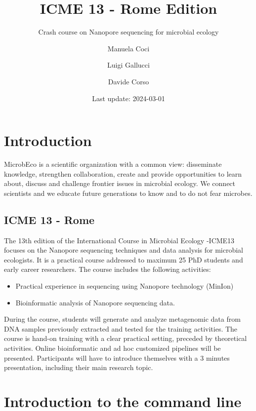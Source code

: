 \documentclass[
]{book}
\title{ICME 13 - Rome Edition}
\subtitle{Crash course on Nanopore sequencing for microbial ecology}
\author{Manuela Coci \and Luigi Gallucci \and Davide Corso}
\date{Last update: 2024-03-01}
\providecommand{\tightlist}{%
  \setlength{\itemsep}{0pt}\setlength{\parskip}{0pt}}
\begin{document}
\maketitle

{
\setcounter{tocdepth}{1}
\tableofcontents
}
\hypertarget{introduction}{%
\chapter{Introduction}\label{introduction}}

MicrobEco is a scientific organization with a common view: disseminate knowledge, strengthen collaboration, create and provide opportunities to learn about, discuss and challenge frontier issues in microbial ecology. We connect scientists and we educate future generations to know and to do not fear microbes.

\hypertarget{icme-13---rome}{%
\section{ICME 13 - Rome}\label{icme-13---rome}}

The 13th edition of the International Course in Microbial Ecology -ICME13 focuses on the Nanopore sequencing techniques and data analysis for microbial ecologists. It is a practical course addressed to maximum 25 PhD students and early career researchers. The course includes the following activities:

\begin{itemize}
\tightlist
\item
  Practical experience in sequencing using Nanopore technology (MinIon)
\item
  Bioinformatic analysis of Nanopore sequencing data.
\end{itemize}

During the course, students will generate and analyze metagenomic data from DNA samples previously extracted and tested for the training activities. The course is hand-on training with a clear practical setting, preceded by theoretical activities. Online bioinformatic and ad hoc customized pipelines will be presented. Participants will have to introduce themselves with a 3 minutes presentation, including their main research topic.

\hypertarget{introduction-to-the-command-line}{%
\chapter{Introduction to the command line}\label{introduction-to-the-command-line}}
\end{document}
